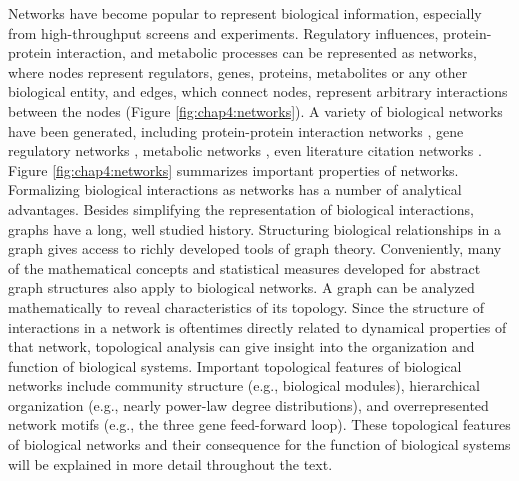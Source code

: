 Networks have become popular to represent biological information, especially from high-throughput screens and experiments. Regulatory influences, protein-protein interaction, and metabolic processes can be represented as networks, where nodes represent regulators, genes, proteins, metabolites or any other biological entity, and edges, which connect nodes, represent arbitrary interactions between the nodes (Figure \ref{fig:chap4:networks}).  A variety of biological networks have been generated, including protein-protein interaction networks \cite{schwikowski_network_2000}, gene regulatory networks  \cite{bonneau_predictive_2007}, metabolic networks  \cite{forster_genome-scale_2003}, even literature citation networks \cite{west_eigenfactor_2010}. Figure \ref{fig:chap4:networks} summarizes important properties of networks. Formalizing biological interactions as networks has a number of analytical advantages. Besides simplifying the representation of biological interactions, graphs have a long, well studied history. Structuring biological relationships in a graph gives access to richly developed tools of graph theory.  Conveniently, many of the mathematical concepts and statistical measures developed for abstract graph structures also apply to biological networks. A graph can be analyzed mathematically to reveal characteristics of its topology. Since the structure of interactions in a network is oftentimes directly related to dynamical properties of that network, topological analysis can give insight into the organization and function of biological systems. Important topological features of biological networks include community structure (e.g., biological modules), hierarchical organization (e.g., nearly power-law degree distributions), and overrepresented network motifs (e.g., the three gene feed-forward loop). These topological features of biological networks and their consequence for the function of biological systems will be explained in more detail throughout the text. 

